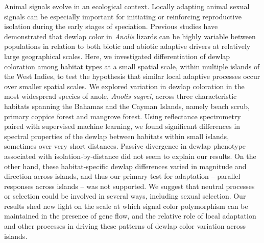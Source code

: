 Animal signals evolve in an ecological context. Locally adapting animal sexual signals can be especially important for initiating or reinforcing reproductive isolation during the early stages of speciation. Previous studies have demonstrated that dewlap color in \textit{Anolis} lizards can be highly variable between populations in relation to both biotic and abiotic adaptive drivers at relatively large geographical scales. Here, we investigated differentiation of dewlap coloration among habitat types at a small spatial scale, within multiple islands of the West Indies, to test the hypothesis that similar local adaptive processes occur over smaller spatial scales. We explored variation in dewlap coloration in the most widespread species of anole, \textit{Anolis sagrei}, across three characteristic habitats spanning the Bahamas and the Cayman Islands, namely beach scrub, primary coppice forest and mangrove forest. Using reflectance spectrometry paired with supervised machine learning, we found significant differences in spectral properties of the dewlap between habitats within small islands, sometimes over very short distances. Passive divergence in dewlap phenotype associated with isolation-by-distance did not seem to explain our results. On the other hand, these habitat-specific dewlap differences varied in magnitude and direction across islands, and thus our primary test for adaptation -- parallel responses across islands -- was not supported. We suggest that neutral processes or selection could be involved in several ways, including sexual selection. Our results shed new light on the scale at which signal color polymorphism can be maintained in the presence of gene flow, and the relative role of local adaptation and other processes in driving these patterns of dewlap color variation across islands.

